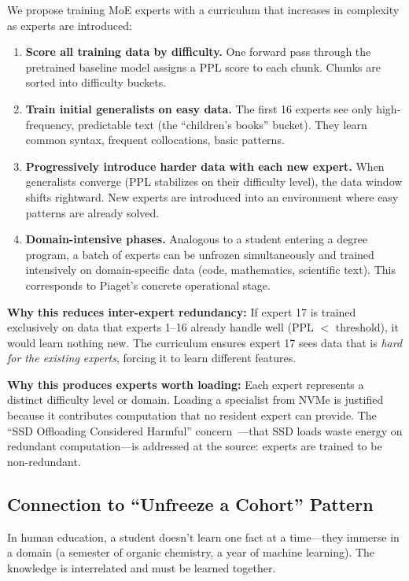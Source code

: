 \documentclass{article}
\begin{document}
We propose training MoE experts with a curriculum that increases in complexity as experts are introduced:

\begin{enumerate}
    \item \textbf{Score all training data by difficulty.} One forward pass through the pretrained baseline model assigns a PPL score to each chunk. Chunks are sorted into difficulty buckets.
    \item \textbf{Train initial generalists on easy data.} The first 16 experts see only high-frequency, predictable text (the ``children's books'' bucket). They learn common syntax, frequent collocations, basic patterns.
    \item \textbf{Progressively introduce harder data with each new expert.} When generalists converge (PPL stabilizes on their difficulty level), the data window shifts rightward. New experts are introduced into an environment where easy patterns are already solved.
    \item \textbf{Domain-intensive phases.} Analogous to a student entering a degree program, a batch of experts can be unfrozen simultaneously and trained intensively on domain-specific data (code, mathematics, scientific text). This corresponds to Piaget's concrete operational stage.
\end{enumerate}

\textbf{Why this reduces inter-expert redundancy:} If expert 17 is trained exclusively on data that experts 1--16 already handle well (PPL $<$ threshold), it would learn nothing new. The curriculum ensures expert 17 sees data that is \emph{hard for the existing experts}, forcing it to learn different features.

\textbf{Why this produces experts worth loading:} Each expert represents a distinct difficulty level or domain. Loading a specialist from NVMe is justified because it contributes computation that no resident expert can provide. The ``SSD Offloading Considered Harmful'' concern~\cite{ssd_harmful2025}---that SSD loads waste energy on redundant computation---is addressed at the source: experts are trained to be non-redundant.

\subsection{Connection to ``Unfreeze a Cohort'' Pattern}

In human education, a student doesn't learn one fact at a time---they immerse in a domain (a semester of organic chemistry, a year of machine learning). The knowledge is interrelated and must be learned together.
\end{document}
